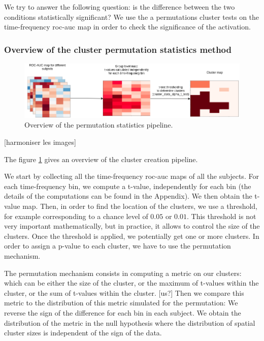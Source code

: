 We try to answer the following question: is the difference between
the two conditions statistically significant? We use the a permutations
cluster tests on the time-frequency roc-auc map in order to check the significance of the activation.

\subsubsection{Overview of the cluster permutation statistics method}

\begin{figure}[ht]
    \centering
    \includegraphics[width=15cm]{images_report/sensor/Permutation_statistics.png}
    \caption[Overview of the permutation statistics pipeline.]%
    {Overview of the permutation statistics pipeline.}
    \label{permutation_statistics_pipeline}
\end{figure}
[harmoniser les images]

The figure \ref{permutation_statistics_pipeline} gives an overview of the cluster creation pipeline.

We start by collecting all the time-frequency roc-auc maps of all the subjects. For each time-frequency bin, we compute a t-value, independently for each bin (the details of the computations can be found in the Appendix). We then obtain the t-value map. Then, in order to find the location of the clusters, we use a threshold, for example corresponding to a chance level of $0.05$ or $0.01$. This threshold is not very important mathematically, but in practice, it allows to control the size of the clusters. Once the threshold is applied, we potentially get one or more clusters. In order to assign a p-value to each cluster, we have to use the permutation mechanism.

The permutation mechanism consists in computing a metric on our clusters: which can be either the size of the cluster, or the maximum of t-values within the cluster, or the sum of t-values within the cluster. [us?] Then we compare this metric to the distribution of this metric simulated for the permutation:
We reverse the sign of the difference for each bin in each subject. We obtain the distribution of the metric in the null hypothesis where the distribution of spatial cluster sizes is independent of the sign of the data.

